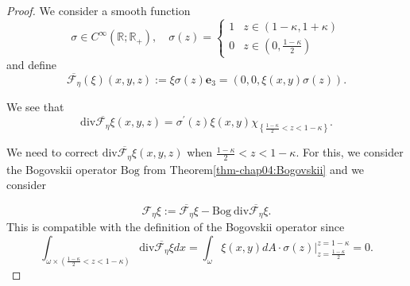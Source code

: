 \documentclass[10pt,a4paper]{article}
\newtheorem{proposition}[theorem]{Proposition}
\numberwithin{equation}{section}
\begin{document}
\begin{proof}
We consider a smooth function 
    \[
\sigma\in C^{\infty}\left(\mathbb{R};\mathbb{R}_{+}\right),\quad\sigma\left(z\right)=\begin{cases}
1 & z\in\left(1-\kappa,1+\kappa\right)\\
0 & z\in\left(0,\frac{1-\kappa}{2}\right)
\end{cases}
\]
and define 
\begin{equation}
\overline{\mathcal{F}_{\eta}}\left(\xi\right)\left(x,y,z\right):=\xi\sigma\left(z\right)\mathbf{e}_{3}=\left(0,0,\xi\left(x,y\right)\sigma\left(z\right)\right).
\end{equation}


We see that 
\[
\text{div}\overline{\mathcal{F}_{\eta}}\xi\left(x,y,z\right)=\sigma^{\prime}\left(z\right)\xi\left(x,y\right)\chi_{\left\{ \frac{1-\kappa}{2}<z<1-\kappa\right\}}.
\] 

We need to correct  $\text{div}\overline{\mathcal{F}_{\eta}}\xi\left(x,y,z\right)$  when $\frac{1-\kappa}{2}<z<1-\kappa$. 
For this, we consider the Bogovskii operator $\text{Bog}$ from Theorem\ref{thm-chap04:Bogovskii}
and we consider

\[
\mathcal{F}_{\eta}\xi:=\overline{\mathcal{F}_{\eta}}\xi-\text{Bog}\ \text{div}\overline{\mathcal{F}_{\eta}}\xi.
\]
 This is compatible with the definition of the Bogovskii operator since 
 \[
 \int_{\omega\times\left(\frac{1-\kappa}{2}<z<1-\kappa\right)}\text{div}\overline{\mathcal{F}_{\eta}}\xi dx=\int_{\omega}\xi\left(x,y\right)dA\cdot\left.\sigma\left(z\right)\right|_{z=\frac{1-\kappa}{2}}^{z=1-\kappa}=0.
 \]
\end{proof}

\end{document}
